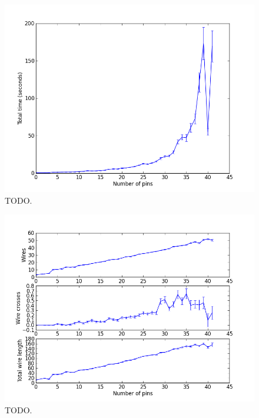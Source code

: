 \begin{figure}[H]
\begin{center}
\includegraphics[width=\textwidth]{Images/final_algorithm_time_trend.png}
\caption{TODO.}
\label{fig:final_time_trend}
\end{center}
\end{figure}

\begin{figure}[H]
\begin{center}
\includegraphics[width=\textwidth]{Images/final_algorithm_quality_trend.png}
\caption{TODO.}
\label{fig:final_quality_trend}
\end{center}
\end{figure}
